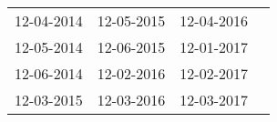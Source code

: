 \begin{supertabular}{llll}
 12-04-2014 &  12-05-2015 &  12-04-2016 \\
 12-05-2014 &  12-06-2015 &  12-01-2017 \\
 12-06-2014 &  12-02-2016 &  12-02-2017 \\
 12-03-2015 &  12-03-2016 &  12-03-2017 \\
\end{supertabular}
